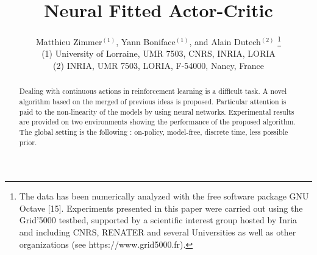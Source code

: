 \documentclass{style/esannV2}
\begin{document}
\title{Neural Fitted Actor-Critic }

\author{Matthieu Zimmer$^{(1)}$, Yann Boniface$^{(1)}$, and Alain Dutech$^{(2)}$
%
% 
\thanks{The data has been numerically analyzed with the free
software package GNU Octave [15].
Experiments presented in this paper were carried out using 
the Grid’5000 testbed, supported by a scientific interest 
group hosted by Inria and including CNRS, RENATER
and several Universities as well as other organizations (see
https://www.grid5000.fr).}
% 
%
\vspace{.3cm}\\
%
(1) University of Lorraine, UMR 7503, CNRS, INRIA, LORIA \\
%
(2) INRIA, UMR 7503, LORIA, F-54000, Nancy, France
}


\maketitle

\begin{abstract}
Dealing with continuous actions in reinforcement learning is 
a difficult task. A novel algorithm based on the merged of previous ideas
is proposed. Particular attention is paid to the non-linearity of the models
by using neural networks. Experimental results are provided on two environments 
showing the performance of the proposed algorithm.
The global setting is the following : on-policy, model-free, discrete time, 
less possible prior.
\end{abstract}
\end{document}
